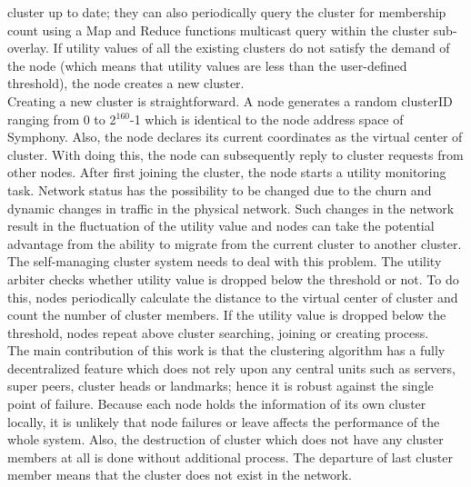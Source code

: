 cluster up to date; they can also periodically query the cluster for
membership count using a Map and Reduce functions multicast query within
the cluster sub-overlay.
%
If utility values of all the existing clusters do not satisfy the demand
of the node (which means that utility values are less than the
user-defined threshold), the node creates a new cluster.\\
%
Creating a new cluster is straightforward.
%
A node generates a random clusterID ranging from 0 to 2$^{160}$-1 which is
identical to the node address space of Symphony.
%
Also, the node declares its current coordinates as the virtual center of
cluster.
%
With doing this, the node can subsequently reply to cluster requests
from other nodes.
%
After first joining the cluster, the node starts a utility monitoring
task.
%
Network status has the possibility to be changed due to the churn and
dynamic changes in traffic in the physical network.
%
Such changes in the network result in the fluctuation of the utility
value and nodes can take the potential advantage from the ability to
migrate from the current cluster to another cluster.
%
The self-managing cluster system needs to deal with this problem.
%
The utility arbiter checks whether utility value is dropped below the
threshold or not.
%
To do this, nodes  periodically calculate the distance to the virtual
center of cluster and count the number of cluster members.
%
If the utility value is dropped below the threshold, nodes repeat above
cluster searching, joining or creating process.\\
%
The main contribution of this work is that the clustering algorithm has
a fully decentralized feature which does not rely upon any central units
such as servers, super peers, cluster heads or landmarks; hence it is
robust against the single point of failure.
%
Because each node holds the information of its own cluster locally, it
is unlikely that node failures or leave affects the performance of the
whole system.
%
Also, the destruction of cluster which does not have any cluster members
at all is done without additional process.
%
The departure of last cluster member means that the cluster does not
exist in the network.
%


